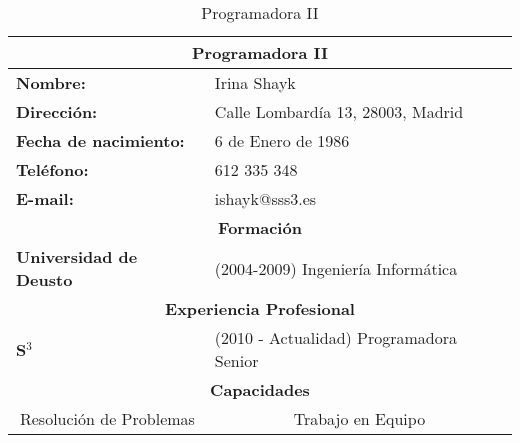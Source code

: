 \begin{table}[!hb]
\begin{center}
\begin{tabular}{p{} p{9cm}}
\multicolumn{2}{c}{\Large{\textbf{Programadora II}}} \\
\hline
\textbf{Nombre:} & Irina Shayk\\
\textbf{Dirección:} & Calle Lombardía 13, 28003, Madrid\\
\textbf{Fecha de nacimiento:} & 6 de Enero de 1986 \\
\textbf{Teléfono:} & 612 335 348\\
\textbf{E-mail:} & ishayk@sss3.es\\
\hline \hline
\multicolumn{2}{c}{\textbf{Formación} } \\
\hline
\textbf{Universidad de Deusto} &  (2004-2009) Ingeniería Informática\\
\hline \hline
\multicolumn{2}{c}{\textbf{Experiencia Profesional} } \\
\hline
\textbf{S$^3$} & (2010 - Actualidad)  Programadora Senior\\
\hline \hline
\multicolumn{2}{c}{\textbf{Capacidades} } \\
\hline
\multicolumn{1}{c}{Resolución de Problemas} & \multicolumn{1}{c}{Trabajo en Equipo} \\
\hline
\end{tabular}
\caption{Programadora II}
\label{tab:programadoraII}
\end{center}
\end{table}
